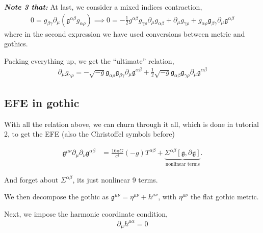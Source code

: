 \documentclass[a4paper, 12pt]{article}
\begin{document}
  \textbf{\textit{Note 3 that:}} At last, we consider a mixed indices
  contraction, 
  \begin{align}
    \label{mixed contraction}
    0 = g_{\beta \gamma} \partial_{\mu}^{}( \mathfrak{g}^{\alpha \beta}
    g_{\alpha \rho}  ) \implies 0 = -
    \frac{1}{2} g^{\alpha \beta} g_{\gamma \rho}
    \partial_{\mu}^{} g_{\alpha \beta} + \partial_{\mu}^{}
    g_{\gamma \rho} + g_{\alpha \rho} \mathfrak{g}_{\beta \gamma}
    \partial_{\mu}^{} \mathfrak{g}^{\alpha \beta}
  \end{align}
  where in the second expression we have used conversions between metric and
  gothics. 

  Packing everything up, we get the \enquote{ultimate} relation, 
  \begin{align}
    \label{ultimate conversion}
    \partial_{\mu}^{} g_{\gamma \rho} = - \sqrt{-g}
    \mathfrak{g}_{\alpha \rho} \mathfrak{g}_{\beta \gamma}
    \partial_{\mu}^{} \mathfrak{g}^{\alpha \beta} + \frac{1}{2} \sqrt{-g}
    \mathfrak{g}_{\alpha \beta} \mathfrak{g}_{\gamma \rho}
    \partial_{\mu}^{} \mathfrak{g}^{\alpha \beta}
  \end{align}

  \subsection{EFE in gothic}%
    \label{sub:EFE in gothic}
    

  With all the relation above, we can churn through it all, which is done in
  tutorial 2, to get the EFE (also the Christoffel symbols before)

\begin{align}
  \label{gothicEFE}
  \mathfrak{g}^{\mu \nu} \partial_{\mu}^{} \partial_{\nu}^{}
  \mathfrak{g}^{\alpha \beta}  &= \frac{16 \pi G}{c^4} (-g) T^{\alpha
  \beta} + \underbrace{\Sigma^{\alpha \beta}[\mathfrak{g}, \partial_{}^{}
  \mathfrak{g}] }_{\textrm{nonlinear terms}}. 
\end{align}

And forget about \( \Sigma^{\alpha \beta}  \), its just nonlinear 9 terms.


We then decompose the gothic as \( \mathfrak{g}^{\mu \nu} = \eta^{\mu \nu}
+ h^{\mu \nu} \), with \( \eta^{\mu \nu} \) the flat gothic metric. 

Next, we impose the harmonic coordinate condition, 
\begin{align}
  \label{harmonic coordinate coordinates}
  \partial_{\mu}^{} h^{\mu \alpha} = 0
\end{align}
\end{document}
